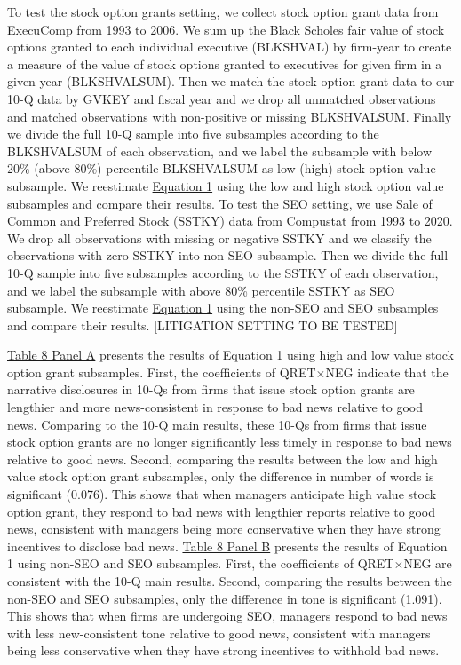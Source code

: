 \documentclass[a4paper]{article}
\begin{document}
\begin{spacing}{2}
To test the stock option grants setting, we collect stock option grant data from ExecuComp from 1993 to 2006. We sum up the Black Scholes fair value of stock options granted to each individual executive (BLKSHVAL) by firm-year to create a measure of the value of stock options granted to executives for given firm in a given year (BLKSHVALSUM). Then we match the stock option grant data to our 10-Q data by GVKEY and fiscal year and we drop all unmatched observations and matched observations with non-positive or missing BLKSHVALSUM. Finally we divide the full 10-Q sample into five subsamples according to the BLKSHVALSUM of each observation, and we label the subsample with below 20\% (above 80\%) percentile BLKSHVALSUM as low (high) stock option value subsample. We reestimate \hyperref[eq1]{Equation 1} using the low and high stock option value subsamples and compare their results. To test the SEO setting, we use Sale of Common and Preferred Stock (SSTKY) data from Compustat from 1993 to 2020. We drop all observations with missing or negative SSTKY and we classify the observations with zero SSTKY into non-SEO subsample. Then we divide the full 10-Q sample into five subsamples according to the SSTKY of each observation, and we label the subsample with above 80\% percentile SSTKY as SEO subsample. We reestimate \hyperref[eq1]{Equation 1} using the non-SEO and SEO subsamples and compare their results. [LITIGATION SETTING TO BE TESTED]

\hyperref[T8]{Table 8 Panel A} presents the results of Equation 1 using high and low value stock option grant subsamples. First, the coefficients of QRET$\times$NEG indicate that the narrative disclosures in 10-Qs from firms that issue stock option grants are lengthier and more news-consistent in response to bad news relative to good news. Comparing to the 10-Q main results, these 10-Qs from firms that issue stock option grants are no longer significantly less timely in response to bad news relative to good news. Second, comparing the results between the low and high value stock option grant subsamples, only the difference in number of words is significant (0.076). This shows that when managers anticipate high value stock option grant, they respond to bad news with lengthier reports relative to good news, consistent with managers being more conservative when they have strong incentives to disclose bad news. \hyperref[T8]{Table 8 Panel B} presents the results of Equation 1 using non-SEO and SEO subsamples. First, the coefficients of QRET$\times$NEG are consistent with the 10-Q main results. Second, comparing the results between the non-SEO and SEO subsamples, only the difference in tone is significant (1.091). This shows that when firms are undergoing SEO, managers respond to bad news with less new-consistent tone relative to good news, consistent with managers being less conservative when they have strong incentives to withhold bad news.


\end{spacing}
\end{document}
